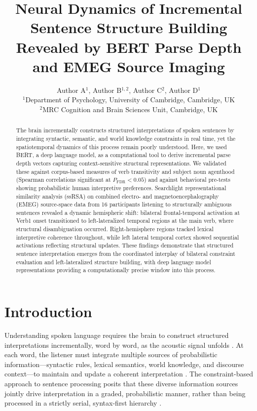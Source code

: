 \documentclass[12pt]{article}
\title{Neural Dynamics of Incremental Sentence Structure Building Revealed by BERT Parse Depth and EMEG Source Imaging}
\author{Author A$^{1}$, Author B$^{1,2}$, Author C$^{2}$, Author D$^{1}$ \\
\small $^{1}$Department of Psychology, University of Cambridge, Cambridge, UK \\
\small $^{2}$MRC Cognition and Brain Sciences Unit, Cambridge, UK}
\date{}
\begin{document}
\maketitle

\begin{abstract}
The brain incrementally constructs structured interpretations of spoken sentences by integrating syntactic, semantic, and world knowledge constraints in real time, yet the spatiotemporal dynamics of this process remain poorly understood. Here, we used BERT, a deep language model, as a computational tool to derive incremental parse depth vectors capturing context-sensitive structural representations. We validated these against corpus-based measures of verb transitivity and subject noun agenthood (Spearman correlations significant at $P_{\textrm{FDR}} < 0.05$) and against behavioral pre-tests showing probabilistic human interpretive preferences. Searchlight representational similarity analysis (ssRSA) on combined electro- and magnetoencephalography (EMEG) source-space data from 16 participants listening to structurally ambiguous sentences revealed a dynamic hemispheric shift: bilateral frontal-temporal activation at Verb1 onset transitioned to left-lateralized temporal regions at the main verb, where structural disambiguation occurred. Right-hemisphere regions tracked lexical interpretive coherence throughout, while left lateral temporal cortex showed sequential activations reflecting structural updates. These findings demonstrate that structured sentence interpretation emerges from the coordinated interplay of bilateral constraint evaluation and left-lateralized structure building, with deep language model representations providing a computationally precise window into this process.
\end{abstract}

\section{Introduction}

Understanding spoken language requires the brain to construct structured interpretations incrementally, word by word, as the acoustic signal unfolds \citep{marslensmith1987functional}. At each word, the listener must integrate multiple sources of probabilistic information---syntactic rules, lexical semantics, world knowledge, and discourse context---to maintain and update a coherent interpretation \citep{tanenhaus1995integration}. The constraint-based approach to sentence processing posits that these diverse information sources jointly drive interpretation in a graded, probabilistic manner, rather than being processed in a strictly serial, syntax-first hierarchy \citep{hale2001probabilistic}.
\end{document}

